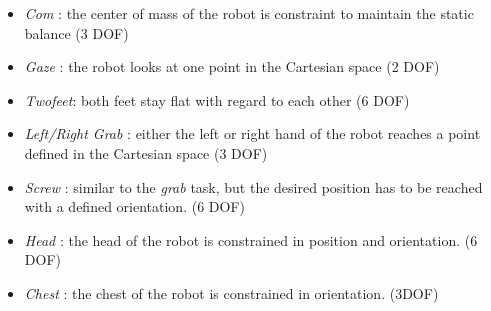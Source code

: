 \documentclass[journal]{IEEEtran}
\begin{document}
\begin{itemize}
  \item \emph{Com} : the center of mass of the robot is constraint to maintain the static balance (3 DOF)
  \item \emph{Gaze} : the robot looks at one point in the Cartesian space (2 DOF)
  \item \emph{Twofeet}: both feet stay flat with regard to each other (6 DOF)
  \item \emph{Left/Right Grab} : either the left or right hand
of the robot reaches a point defined in the Cartesian space (3 DOF)
  \item \emph{Screw} : similar to the \emph{grab} task, but the desired position 
has to be reached with a defined orientation. (6 DOF)
  \item \emph{Head} : the head of the robot is constrained in position and orientation. (6 DOF)
  \item \emph{Chest} : the chest of the robot is constrained in orientation.  (3DOF)
\end{itemize}
\end{document}
